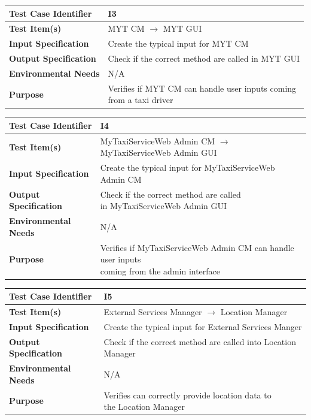 \documentclass[11pt,titlepage]{article} %
\begin{document}
  \begin{table}[ht!]
    \begin{tabular*}{16cm}{ll}
	\hline
	\textbf{Test Case Identifier} & I3\\
	\hline
	\textbf{Test Item(s)} & MYT CM $ \longrightarrow $ MYT GUI \\
	\hline
	\textbf{Input Specification} & Create the typical input for MYT CM\\
	\hline
	\textbf{Output Specification} & Check if the correct method are called in MYT GUI\\
	\hline
	\textbf{Environmental Needs} & N/A\\
	\hline 
	\textbf{Purpose} & \pbox{20cm}{Verifies if MYT CM can handle user inputs coming \\ from a taxi driver} \\
	\hline
    \end{tabular*}
  \end{table}
  
  \begin{table}[ht!]
    \begin{tabular*}{16cm}{ll}
	\hline
	\textbf{Test Case Identifier} & I4\\
	\hline
	\textbf{Test Item(s)} & MyTaxiServiceWeb Admin CM $ \longrightarrow $ MyTaxiServiceWeb Admin GUI \\
	\hline
	\textbf{Input Specification} & Create the typical input for MyTaxiServiceWeb Admin CM\\
	\hline
	\textbf{Output Specification} & \pbox{20cm}{Check if the correct method are called \\ in MyTaxiServiceWeb Admin GUI} \\
	\hline
	\textbf{Environmental Needs} & N/A\\
	\hline
	\textbf{Purpose} & \pbox{20cm}{Verifies if MyTaxiServiceWeb Admin CM can handle user inputs \\ coming from the admin interface} \\
	\hline
    \end{tabular*}
  \end{table}
  
  \begin{table}[ht!]
    \begin{tabular*}{16cm}{ll}
	\hline
	\textbf{Test Case Identifier} & I5 \\
	\hline
	\textbf{Test Item(s)} & External Services Manager  $ \longrightarrow $ Location Manager \\
	\hline
	\textbf{Input Specification} & Create the typical input for External Services Manger\\
	\hline
	\textbf{Output Specification} & Check if the correct method are called into Location Manager\\
	\hline
	\textbf{Environmental Needs} & N/A\\
	\hline
	\textbf{Purpose} & \pbox{20cm}{Verifies can correctly provide location data to \\ the Location Manager} \\
	\hline
    \end{tabular*}
  \end{table}
  
\end{document}
